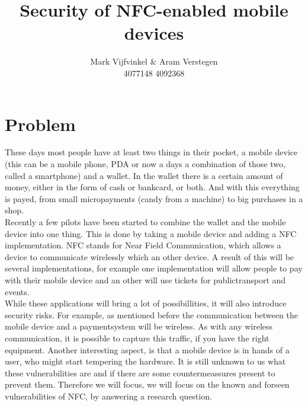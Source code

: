 \documentclass[11pt]{article} %
\title{Security of NFC-enabled mobile devices}
\author{Mark Vijfvinkel \& Aram Verstegen \\ 4077148 4092368}
\date{} %
\begin{document}
\maketitle


\section{Problem}

These days most people have at least two things in their pocket, a mobile device (this can be a mobile phone, PDA or now a days a combination of those two, called a smartphone) and a wallet. In the wallet there is a certain amount of money, either in the form of cash or bankcard, or both. And with this everything is payed, from small micropayments (candy from a machine) to big purchases in a shop.
\\ Recently a few pilots have been started \cite{payter} to combine the wallet and the mobile device into one thing. This is done by taking a mobile device and adding a NFC implementation. NFC stands for Near Field Communication, which allows a device to communicate wirelessly which an other device. A result of this will be several implementations, for example one implementation will allow people to pay with their mobile device and an other will use tickets for publictransport and events. 
\\ While these applications will bring a lot of possibillities, it will also introduce security risks. For example, as mentioned before the communication between the mobile device and a paymentsystem will be wireless. As with any wireless communication, it is possible to capture this traffic, if you have the right equipment. Another interesting aspect, is that a mobile device is in hands of a user, who might start tempering the hardware. It is still unknown to us what these vulnerabilities are and if there are some countermeassures present to prevent them. Therefore we will focus, we will focus on the known and forseen vulnerabilities of NFC, by answering a research question.
\end{document}

